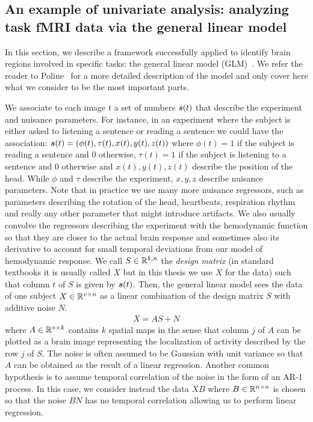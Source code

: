 \subsection{An example of univariate analysis: analyzing task fMRI data via the general linear model}
\label{sec:glm}
In this section, we describe a framework successfully applied to identify brain regions involved in specific tasks: the general linear model
(GLM)~\cite{friston1995analysis}. We refer the reader to
Poline~\cite{poline2012general} for a more detailed description of the model and only cover here what we consider to be the most important parts.

We associate to each image $t$ a set of numbers $\boldsymbol{s}(t)$ that describe the experiment and
nuisance parameters.
For instance, in an experiment where the subject is either asked to listening a
sentence or reading a sentence we could have the association: $\boldsymbol{s}(t) = (\phi(t), \tau(t), x(t), y(t),
z(t))$ where $\phi(t)=1$ if the subject is reading a sentence and $0$ otherwise, $\tau(t)=1$
if the subject is listening to a sentence and $0$ otherwise and  $x(t), y(t), z(t)$ describe the
position of the head. While $\phi$ and $\tau$ describe the experiment, $x, y, z$
describe nuisance parameters.
Note that in practice we use many more nuisance regressors, such
as parameters describing the rotation of the head, heartbeats, respiration
rhythm and really any other parameter that might introduce artifacts. We also
usually convolve the regressors describing the experiment with the hemodynamic
function so that they are closer to the actual brain response and sometimes also its derivative to account for small temporal deviations from our model of hemodynamic response.
We call $S \in \mathbb{R}^{k, n}$ the \emph{design matrix} (in standard textbooks it is
usually called $X$ but in this thesis we use $X$ for the data) such that column
$t$ of $S$ is given by $\boldsymbol{s}(t)$.
Then, the general linear model sees the data of one subject $X \in \mathbb{R}^{v \times n}$ as a linear combination of the
design matrix $S$ with additive noise $N$.
\begin{align}
X = A S + N
\end{align}
where $A \in \mathbb{R}^{v \times k}$ contains $k$ spatial maps in the sense that column $j$
of $A$ can be plotted as a brain image representing the localization of activity
described by the row $j$ of $S$.
The noise is often assumed to be Gaussian with unit variance so that $A$ can be obtained as the
result of a linear regression. Another common hypothesis is to assume temporal
correlation of the noise in the form of an AR-1 process. In this case, we 
consider instead the data $XB$ where $B \in \mathbb{R}^{n \times n}$ is chosen so that the
noise $BN$ has no temporal correlation allowing us to perform linear regression.

